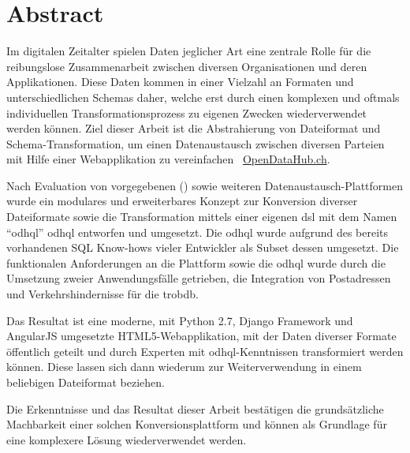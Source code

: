 \begin{comment}
2.1.2 Abstract
Ein Abstract ist eine rein textuelle kurze Zusammenfassung der Arbeit. Der Abstract ist für die Recherche in grossen Dokumentensammlungen geeignet. Er umfasst nie mehr als eine Seite, typisch sogar nur etwa 200 Worte (etwa 20 Zeilen).
Der Begriff ‚Kurzfassung’ ist zuwenig genau definiert; er soll wenn möglich vermieden werden.
\end{comment}


{}
\chapter*{Abstract}

Im digitalen Zeitalter spielen Daten jeglicher Art eine zentrale Rolle für die reibungslose Zusammenarbeit zwischen diversen Organisationen und deren Applikationen. Diese Daten kommen in einer Vielzahl an Formaten und unterschiedlichen Schemas daher, welche erst durch einen komplexen und oftmals individuellen Transformationsprozess zu eigenen Zwecken wiederverwendet werden können. Ziel dieser Arbeit ist die Abstrahierung von Dateiformat und Schema-Transformation, um einen Datenaustausch zwischen diversen Parteien mit Hilfe einer Webapplikation zu vereinfachen \textendash\ \href{http://beta.opendatahub.ch/}{OpenDataHub.ch}.

\medskip
Nach Evaluation von vorgegebenen () sowie weiteren Datenaustausch-Plattformen wurde ein modulares und erweiterbares Konzept zur Konversion diverser Dateiformate sowie die Transformation mittels einer eigenen \gls{dsl} mit dem Namen ``\acl{odhql}'' \acs{odhql} entworfen und umgesetzt. Die \acs{odhql} wurde aufgrund des bereits vorhandenen SQL Know-hows vieler Entwickler als Subset dessen umgesetzt. Die funktionalen Anforderungen an die Plattform sowie die \acs{odhql} wurde durch die Umsetzung zweier Anwendungsfälle getrieben, die Integration von Postadressen und Verkehrshindernisse für die \gls{trobdb}.

\medskip
Das Resultat ist eine moderne, mit Python 2.7, Django Framework und AngularJS umgesetzte HTML5-Webapplikation, mit der Daten diverser Formate öffentlich geteilt und durch Experten mit \acs{odhql}-Kenntnissen transformiert werden können. Diese lassen sich dann wiederum zur Weiterverwendung in einem beliebigen Dateiformat beziehen.

\medskip
Die Erkenntnisse und das Resultat dieser Arbeit bestätigen die grundsätzliche Machbarkeit einer solchen Konversionsplattform und können als Grundlage für eine komplexere Lösung wiederverwendet werden.

\glsresetall